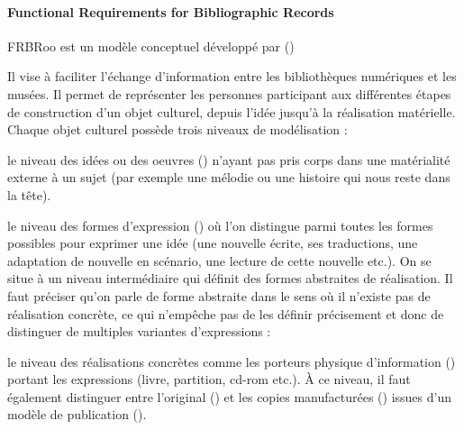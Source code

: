 \paragraph{Functional Requirements for Bibliographic Records}
FRBRoo est un modèle conceptuel développé par (\cite{Aalberg2008})

Il vise à faciliter l’échange d’information entre les bibliothèques numériques et les musées. 
Il permet de représenter les personnes participant aux différentes étapes de construction d’un objet culturel, depuis l’idée jusqu’à la réalisation matérielle.
Chaque objet culturel possède trois niveaux de modélisation :
\begin{liste}
	\item le niveau des idées ou des oeuvres () n’ayant pas pris corps dans une matérialité externe à un sujet (par exemple une mélodie ou une histoire qui nous reste dans la tête). 

	\item le niveau des formes d'expression () où l'on distingue parmi toutes les formes possibles pour exprimer une idée (une nouvelle écrite, ses traductions, une adaptation de nouvelle en scénario, une lecture de cette nouvelle etc.).
	On se situe à un niveau intermédiaire qui définit des formes abstraites de  réalisation.
	Il faut préciser qu'on parle de forme abstraite dans le sens où il n'existe pas de réalisation concrète, ce qui n'empêche pas de les définir précisement et donc de distinguer de multiples variantes d'expressions :

	
	\item le niveau des réalisations concrètes comme les porteurs physique d’information () portant les expressions (livre, partition, cd-rom etc.). 
	À ce niveau, il faut également distinguer entre l’original () et les copies manufacturées () issues d’un modèle de publication (). %
\end{liste}





